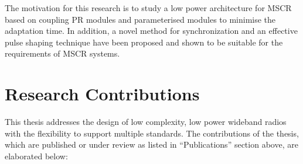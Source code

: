 The motivation for this research is to study a low power architecture for MSCR based on coupling PR modules and parameterised modules to minimise the adaptation time. 
In addition, a novel method for synchronization and an effective pulse shaping technique have been proposed and shown to be suitable for the requirements of MSCR systems.
\section{Research Contributions}

This thesis addresses the design of low complexity, low power wideband radios with the flexibility to support multiple standards. 
The contributions of the thesis, which are published or under review as listed in ``Publications'' section above, are elaborated below:
